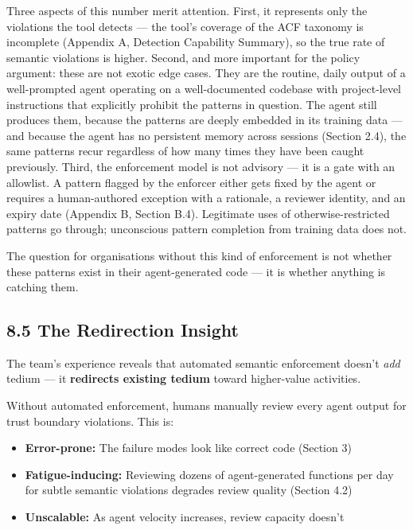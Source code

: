 \documentclass[a4paper,11pt]{report}
\providecommand{\tightlist}{%
  \setlength{\itemsep}{0pt}\setlength{\parskip}{0pt}}
\begin{document}
Three aspects of this number merit attention. First, it represents only
the violations the tool detects --- the tool's coverage of the ACF
taxonomy is incomplete (Appendix A, Detection Capability Summary), so
the true rate of semantic violations is higher. Second, and more
important for the policy argument: these are not exotic edge cases. They
are the routine, daily output of a well-prompted agent operating on a
well-documented codebase with project-level instructions that explicitly
prohibit the patterns in question. The agent still produces them,
because the patterns are deeply embedded in its training data --- and
because the agent has no persistent memory across sessions (Section
2.4), the same patterns recur regardless of how many times they have
been caught previously. Third, the enforcement model is not advisory ---
it is a gate with an allowlist. A pattern flagged by the enforcer either
gets fixed by the agent or requires a human-authored exception with a
rationale, a reviewer identity, and an expiry date (Appendix B, Section
B.4). Legitimate uses of otherwise-restricted patterns go through;
unconscious pattern completion from training data does not.

The question for organisations without this kind of enforcement is not
whether these patterns exist in their agent-generated code --- it is
whether anything is catching them.

\hypertarget{the-redirection-insight}{%
\subsection{8.5 The Redirection Insight}\label{the-redirection-insight}}

The team's experience reveals that automated semantic enforcement
doesn't \emph{add} tedium --- it \textbf{redirects existing tedium}
toward higher-value activities.

Without automated enforcement, humans manually review every agent output
for trust boundary violations. This is:

\begin{itemize}
\tightlist
\item
  \textbf{Error-prone:} The failure modes look like correct code
  (Section 3)
\item
  \textbf{Fatigue-inducing:} Reviewing dozens of agent-generated
  functions per day for subtle semantic violations degrades review
  quality (Section 4.2)
\item
  \textbf{Unscalable:} As agent velocity increases, review capacity
  doesn't
\end{itemize}
\end{document}
